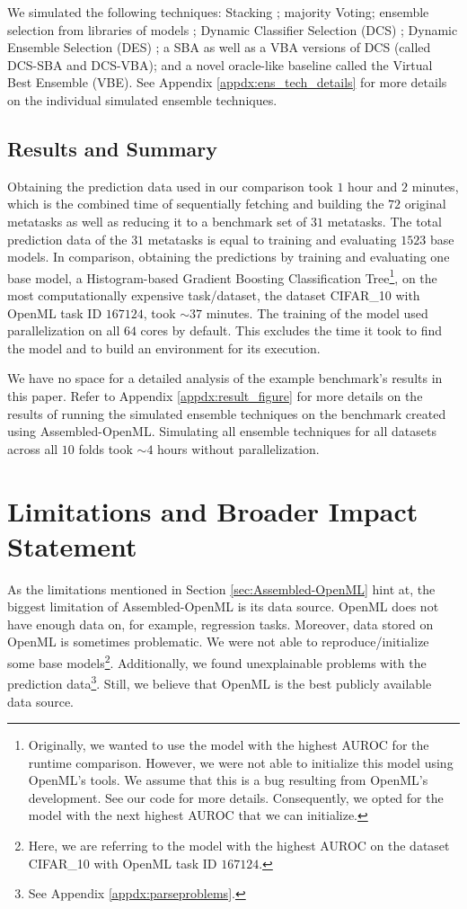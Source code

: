\documentclass[11pt]{article}
\begin{document}
We simulated the following techniques: Stacking \citep{DBLP:journals/nn/Wolpert92}; majority Voting; ensemble selection from libraries of models \citep{caruana2004ensemble}; Dynamic Classifier Selection (DCS) \citep{giacinto2001dynamic}; Dynamic Ensemble Selection (DES) \citep{ko2008dynamic}; a SBA as well as a VBA versions of DCS (called DCS-SBA and DCS-VBA); and a novel oracle-like baseline called the Virtual Best Ensemble (VBE).
See Appendix \ref{appdx:ens_tech_details} for more details on the individual simulated ensemble techniques. 



\subsection{Results and Summary}
\label{sec:results}
Obtaining the prediction data used in our comparison took $1$ hour and $2$ minutes, which is the combined time of sequentially fetching and building the $72$ original metatasks as well as reducing it to a benchmark set of $31$ metatasks. 
The total prediction data of the $31$ metatasks is equal to training and evaluating $1523$ base models. 
In comparison, obtaining the predictions by training and evaluating one base model, a Histogram-based Gradient Boosting Classification Tree\footnote{
Originally, we wanted to use the model with the highest AUROC for the runtime comparison. However, we were not able to initialize this model using OpenML's tools. We assume that this is a bug resulting from OpenML's development. See our code for more details. Consequently, we opted for the model with the next highest AUROC that we can initialize. 
},
on the most computationally expensive task/dataset, the dataset CIFAR\_10 with OpenML task ID $167124$, took ${\sim} 37$ minutes.
The training of the model used parallelization on all $64$ cores by default.
This excludes the time it took to find the model and to build an environment for its execution. 

We have no space for a detailed analysis of the example benchmark's results in this paper. Refer to Appendix \ref{appdx:result_figure} for more details on the results of running the simulated ensemble techniques on the benchmark created using Assembled-OpenML.
Simulating all ensemble techniques for all datasets across all $10$ folds took ${\sim} 4$ hours without parallelization. 

\section{Limitations and Broader Impact Statement}
\label{sec:limits}
As the limitations mentioned in Section \ref{sec:Assembled-OpenML} hint at, the biggest limitation of Assembled-OpenML is its data source. 
OpenML does not have enough data on, for example, regression tasks. 
Moreover, data stored on OpenML is sometimes problematic. We were not able to reproduce/initialize some base models\footnote{Here, we are referring to the model with the highest AUROC on the dataset CIFAR\_10 with OpenML task ID $167124$.}. Additionally, we found unexplainable problems with the prediction data\footnote{See Appendix \ref{appdx:parseproblems}.}.
Still, we believe that OpenML is the best publicly available data source. 
\end{document}
